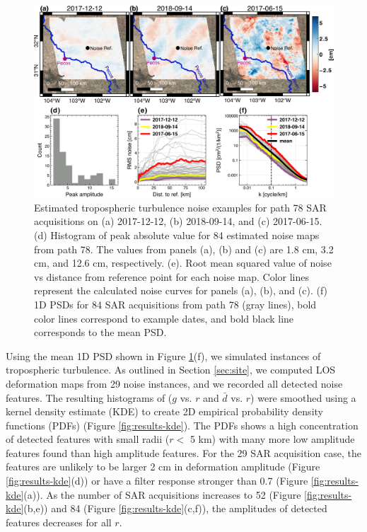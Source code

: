 \documentclass{utexasthesis}
\begin{document}
\begin{figure}[hbt!]
\centering 
\includegraphics[width=0.98\linewidth]{paper2/figures/figure5_noise_path78.png}
\caption{Estimated tropospheric turbulence noise examples for path 78 SAR acquisitions on (a) 2017-12-12, (b) 2018-09-14, and (c) 2017-06-15.
(d) Histogram of peak absolute value for 84 estimated noise maps from path 78. The values from panels (a), (b) and (c) are 1.8 cm, 3.2 cm, and 12.6 cm, respectively. 
(e). Root mean squared value of noise vs distance from reference point for each noise map. Color lines represent the calculated noise curves for panels (a), (b), and (c).
(f) 1D PSDs for 84 SAR acquisitions from path 78 (gray lines), bold color lines correspond to example dates, and bold black line corresponds to the mean PSD. 
}
\label{fig:results-noise}
\end{figure}



Using the mean 1D PSD shown in Figure \ref{fig:results-noise}(f), we simulated instances of tropospheric turbulence.
As outlined in Section \ref{sec:site}, we computed LOS deformation maps from 29 noise instances, and we recorded all detected noise features. The resulting histograms of ($g$ vs. $r$ and $\bar{d}$ vs. $r$) were smoothed using a kernel density estimate (KDE) \cite{Scott2015MultivariateDensityEstimation} to create 2D empirical probability density functions (PDFs) (Figure \ref{fig:results-kde}). The PDFs shows a high concentration of detected features with small radii ($r <$ 5 km) with many more low amplitude features found than high amplitude features. For the 29 SAR acquisition case, the features are unlikely to be larger 2 cm in deformation amplitude (Figure \ref{fig:results-kde}(d)) or have a filter response stronger than 0.7 (Figure \ref{fig:results-kde}(a)). As the number of SAR acquisitions increases to 52 (Figure \ref{fig:results-kde}(b,e)) and 84 (Figure \ref{fig:results-kde}(c,f)), the amplitudes of detected features decreases for all $r$.
\end{document}
